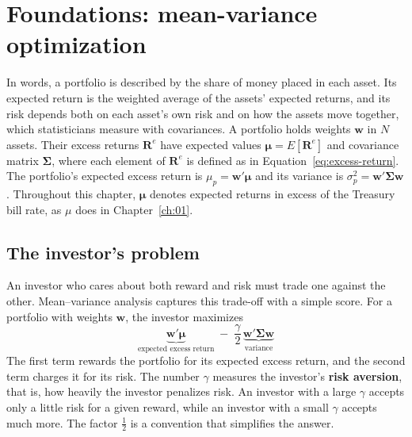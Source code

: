 \section{Foundations: mean-variance optimization}
\label{sec:12-foundations}

In words, a portfolio is described by the share of money placed in each asset. Its expected return is the weighted average of the assets' expected returns, and its risk depends both on each asset's own risk and on how the assets move together, which statisticians measure with covariances. A portfolio holds weights $\mathbf{w}$ in $N$ assets. Their excess returns $\mathbf{R}^{e}$ have expected values $\boldsymbol{\mu} = E[\mathbf{R}^{e}]$ and covariance matrix $\boldsymbol{\Sigma}$, where each element of $\mathbf{R}^{e}$ is defined as in Equation~\eqref{eq:excess-return}. The portfolio's expected excess return is $\mu_p = \mathbf{w}'\boldsymbol{\mu}$ and its variance is $\sigma_p^2 = \mathbf{w}'\boldsymbol{\Sigma}\mathbf{w}$. Throughout this chapter, $\boldsymbol{\mu}$ denotes expected returns in excess of the Treasury bill rate, as $\mu$ does in Chapter~\ref{ch:01}.

\subsection{The investor's problem}
\label{sec:12-problem}

An investor who cares about both reward and risk must trade one against the other. Mean--variance analysis captures this trade-off with a simple score. For a portfolio with weights $\mathbf{w}$, the investor maximizes
\begin{equation}
  \underbrace{\mathbf{w}'\boldsymbol{\mu}}_{\text{expected excess return}} \; - \; \frac{\gamma}{2}\,\underbrace{\mathbf{w}'\boldsymbol{\Sigma}\mathbf{w}}_{\text{variance}}
  \label{eq:12-mv-objective}
\end{equation}
The first term rewards the portfolio for its expected excess return, and the second term charges it for its risk. The number $\gamma$ measures the investor's \textbf{risk aversion}, that is, how heavily the investor penalizes risk. An investor with a large $\gamma$ accepts only a little risk for a given reward, while an investor with a small $\gamma$ accepts much more. The factor $\tfrac{1}{2}$ is a convention that simplifies the answer.

